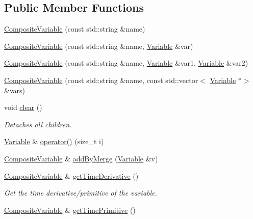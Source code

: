 \subsection*{Public Member Functions}
\begin{DoxyCompactItemize}
\item 
\hyperlink{classocra_1_1CompositeVariable_a1611f9c8b278c183ca68837e0b91f4f0}{Composite\+Variable} (const std\+::string \&name)
\item 
\hyperlink{classocra_1_1CompositeVariable_a131e1ee2f3b4dcd3439b8eb389777f81}{Composite\+Variable} (const std\+::string \&name, \hyperlink{classocra_1_1Variable}{Variable} \&var)
\item 
\hyperlink{classocra_1_1CompositeVariable_a7dce5cb02821d4da44f606a45407e0ae}{Composite\+Variable} (const std\+::string \&name, \hyperlink{classocra_1_1Variable}{Variable} \&var1, \hyperlink{classocra_1_1Variable}{Variable} \&var2)
\item 
\hyperlink{classocra_1_1CompositeVariable_a80c80db8037f36c9ac84a9b03171013f}{Composite\+Variable} (const std\+::string \&name, const std\+::vector$<$ \hyperlink{classocra_1_1Variable}{Variable} $\ast$$>$ \&vars)
\item 
void \hyperlink{classocra_1_1CompositeVariable_a64e6f462d217b4d3ab3d2b5364373ce8}{clear} ()
\begin{DoxyCompactList}\small\item\em Detaches all children. \end{DoxyCompactList}\item 
\hyperlink{classocra_1_1Variable}{Variable} \& \hyperlink{classocra_1_1CompositeVariable_a6cbd2ebea33e1fd523453b9448b3fde2}{operator()} (size\+\_\+t i)
\item 
\hyperlink{classocra_1_1CompositeVariable}{Composite\+Variable} \& \hyperlink{classocra_1_1CompositeVariable_a9b09f9bf88fd58fcdad695d762c11d13}{add\+By\+Merge} (\hyperlink{classocra_1_1Variable}{Variable} \&v)
\item 
\hyperlink{classocra_1_1CompositeVariable}{Composite\+Variable} \& \hyperlink{classocra_1_1CompositeVariable_ad4c753d254356c1b3686a3da04b0d499}{get\+Time\+Derivative} ()
\begin{DoxyCompactList}\small\item\em Get the time derivative/primitive of the variable. \end{DoxyCompactList}\item 
\hyperlink{classocra_1_1CompositeVariable}{Composite\+Variable} \& \hyperlink{classocra_1_1CompositeVariable_a7870c51e9904734593d7990033a7cca4}{get\+Time\+Primitive} ()
$$
\end{DoxyCompactItemize}
